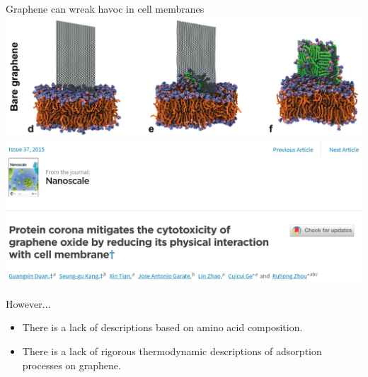 \documentclass[aspectratio=169, compress]{beamer}
\begin{document}
\begin{frame}{Graphene can wreak havoc in cell membranes}
  \centering
      \includegraphics[width=.7\textwidth]{figures/Duan_2015a}
      \includegraphics[width=.7\textwidth]{figures/Duan_2015}
\end{frame}


\begin{frame}

\begin{block}{However...}
\begin{itemize}
\item There is a lack of descriptions based on amino acid composition.
\item There is a lack of rigorous thermodynamic descriptions of
  adsorption processes on graphene.
\end{itemize}
\end{block}

\end{frame}
\end{document}
